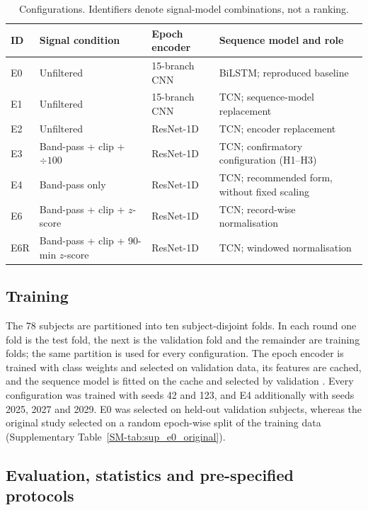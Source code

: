\documentclass[11pt,a4paper]{article}
\newcommand{\mf}{\text{macro-F1}}
\begin{document}
\begin{table}[t]
\centering
\caption{Configurations. Identifiers denote signal-model combinations, not a ranking.}
\label{tab:configs}
\small
\begin{tabularx}{\textwidth}{llYY}
\toprule
\textbf{ID} & \textbf{Signal condition} & \textbf{Epoch encoder} & \textbf{Sequence model and role} \\
\midrule
E0 & Unfiltered & 15-branch CNN & BiLSTM; reproduced baseline \\
E1 & Unfiltered & 15-branch CNN & TCN; sequence-model replacement \\
E2 & Unfiltered & ResNet-1D & TCN; encoder replacement \\
E3 & Band-pass + clip + $\div100$ & ResNet-1D & TCN; confirmatory configuration (H1--H3) \\
E4 & Band-pass only & ResNet-1D & TCN; recommended form, without fixed scaling \\
E6 & Band-pass + clip + $z$-score & ResNet-1D & TCN; record-wise normalisation \\
E6R & Band-pass + clip + 90-min $z$-score & ResNet-1D & TCN; windowed normalisation \\
\bottomrule
\end{tabularx}
\end{table}

\subsection{Training}

The 78 subjects are partitioned into ten subject-disjoint folds. In each round one fold is the test
fold, the next is the validation fold and the remainder are training folds; the same partition is
used for every configuration. The epoch encoder is trained with class weights and selected on
validation data, its features are cached, and the sequence model is fitted on the cache and selected
by validation \mf. Every configuration was trained with seeds 42 and 123, and E4 additionally with
seeds 2025, 2027 and 2029. E0 was selected on held-out validation subjects, whereas the original
study selected on a random epoch-wise split of the training data
(Supplementary Table~\ref{SM-tab:sup_e0_original}).

\subsection{Evaluation, statistics and pre-specified protocols}
\label{sec:protocols}
\end{document}
